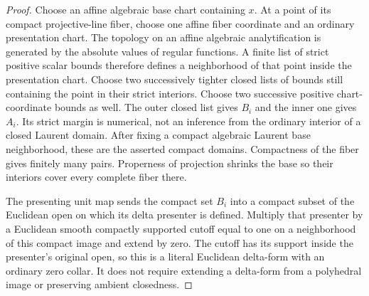 \begin{proof}
Choose an affine algebraic base chart containing $x$.
At a point of its compact projective-line fiber, choose
one affine fiber coordinate and an ordinary presentation
chart.  The topology on an affine algebraic
analytification is generated by the absolute values of
regular functions.  A finite list of strict positive
scalar bounds therefore defines a neighborhood of that
point inside the presentation chart.  Choose two successively
tighter closed lists of bounds still containing the point
in their strict interiors.  Choose two successive positive
chart-coordinate bounds as well.  The outer closed list
gives $B_i$ and the inner one gives $A_i$.  Its strict
margin is numerical, not an inference from the ordinary
interior of a closed Laurent domain.  After fixing a
compact algebraic Laurent base neighborhood, these are
the asserted compact domains.  Compactness of the fiber
gives finitely many pairs.  Properness of projection
shrinks the base so their interiors cover every complete
fiber there.

The presenting unit map sends the compact set $B_i$
into a compact subset of the Euclidean open on which
its delta presenter is defined.  Multiply that presenter
by a Euclidean smooth compactly supported cutoff equal
to one on a neighborhood of this compact image and
extend by zero.  The cutoff has its support inside the
presenter's original open, so this is a literal
Euclidean delta-form with an ordinary zero collar.  It
does not require extending a delta-form from a
polyhedral image or preserving ambient closedness.
\end{proof}

